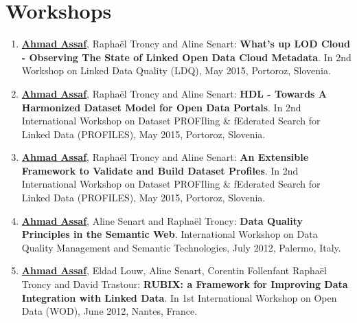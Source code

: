 \section*{Workshops}\label{sec:workshop}
\begin{enumerate}
\item \underline{\textbf{Ahmad Assaf}}, {R}apha{\"e}l {T}roncy and {A}line {S}enart: \textbf{{W}hat's up {LOD} Cloud - Observing The State of Linked Open Data Cloud Metadata}. In 2nd Workshop on Linked Data Quality (LDQ), May 2015, {P}ortoroz, {S}lovenia.
\item \underline{\textbf{Ahmad Assaf}}, {R}apha{\"e}l {T}roncy and {A}line {S}enart: \textbf{{HDL} - Towards A Harmonized Dataset Model for Open Data Portals}. In 2nd {I}nternational {W}orkshop on {D}ataset {PROFI}ling \& f{E}derated {S}earch for {L}inked {D}ata (PROFILES), May 2015, {P}ortoroz, {S}lovenia.
\item \underline{\textbf{Ahmad Assaf}}, {R}apha{\"e}l {T}roncy and {A}line {S}enart: \textbf{{A}n Extensible Framework to Validate and Build Dataset Profiles}. In 2nd {I}nternational {W}orkshop on {D}ataset {PROFI}ling \& f{E}derated {S}earch for {L}inked {D}ata (PROFILES), May 2015, {P}ortoroz, {S}lovenia.
\item \underline{\textbf{Ahmad Assaf}}, {A}line {S}enart and {R}apha{\"e}l {T}roncy: \textbf{{D}ata Quality Principles in the Semantic Web}. International Workshop on Data Quality Management and Semantic Technologies, July 2012, {P}alermo, {I}taly.
\item \underline{\textbf{Ahmad Assaf}}, {E}ldad {L}ouw, {A}line {S}enart, {C}orentin {F}ollenfant {R}apha{\"e}l {T}roncy and {D}avid {T}rastour: \textbf{{RUBIX}: a Framework for Improving Data Integration with Linked Data}. In 1st International Workshop on Open Data (WOD), June 2012, {N}antes, {F}rance.
\end{enumerate}
